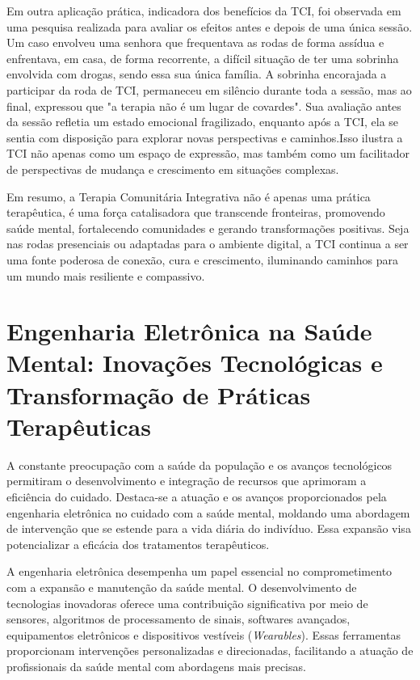         Em outra aplicação prática, indicadora dos benefícios da TCI, foi observada em uma pesquisa realizada para avaliar os efeitos antes e depois de uma única sessão. Um caso envolveu uma senhora que frequentava as rodas de forma assídua e enfrentava, em casa, de forma recorrente, a difícil situação de ter uma sobrinha envolvida com drogas, sendo essa sua única família. A sobrinha encorajada a participar da roda de TCI, permaneceu em silêncio durante toda a sessão, mas ao final, expressou que "a terapia não é um lugar de covardes". Sua avaliação antes da sessão refletia um estado emocional fragilizado, enquanto após a TCI, ela se sentia com disposição para explorar novas perspectivas e caminhos.\cite{LEITEePALOS}Isso ilustra a TCI não apenas como um espaço de expressão, mas também como um facilitador de perspectivas de mudança e crescimento em situações complexas.
        
        Em resumo, a Terapia Comunitária Integrativa não é apenas uma prática terapêutica, é uma força catalisadora que transcende fronteiras, promovendo saúde mental, fortalecendo comunidades e gerando transformações positivas. Seja nas rodas presenciais ou adaptadas para o ambiente digital, a TCI continua a ser uma fonte poderosa de conexão, cura e crescimento, iluminando caminhos para um mundo mais resiliente e compassivo.
    
    \chapter{Engenharia Eletrônica na Saúde Mental: Inovações Tecnológicas e Transformação de Práticas Terapêuticas}
        A constante preocupação com a saúde da população e os avanços tecnológicos permitiram o desenvolvimento e integração de recursos que aprimoram a eficiência do cuidado. Destaca-se a atuação e os avanços proporcionados pela engenharia eletrônica no cuidado com a saúde mental, moldando uma abordagem de intervenção que se estende para a vida diária do indivíduo. Essa expansão visa potencializar a eficácia dos tratamentos terapêuticos.
        
        A engenharia eletrônica desempenha um papel essencial no comprometimento com a expansão e manutenção da saúde mental. O desenvolvimento de tecnologias inovadoras oferece uma contribuição significativa por meio de sensores, algoritmos de processamento de sinais, softwares avançados, equipamentos eletrônicos e dispositivos vestíveis (\textit{Wearables}). Essas ferramentas proporcionam intervenções personalizadas e direcionadas, facilitando a atuação de profissionais da saúde mental com abordagens mais precisas.
        
